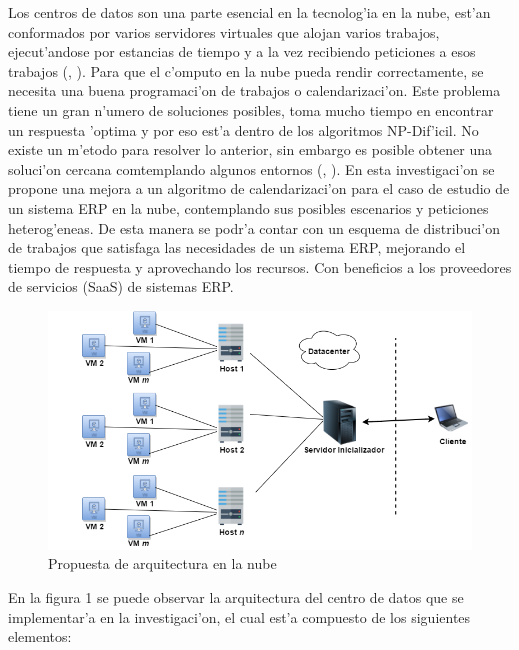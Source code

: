 Los centros de datos son una parte esencial en la tecnolog'ia en la nube, est'an conformados por varios servidores virtuales que alojan varios trabajos, ejecut'andose por estancias de tiempo y a la vez recibiendo peticiones a esos trabajos (\citeauthor{shimpy2014different}, \citeyear{shimpy2014different}).
Para que el c'omputo en la nube pueda rendir correctamente, se necesita una buena programaci'on de trabajos o calendarizaci'on. Este problema tiene un gran n'umero de soluciones posibles, toma mucho tiempo en encontrar un respuesta 'optima y por eso est'a dentro de los algoritmos NP-Dif'icil. No existe un m'etodo para resolver lo anterior, sin embargo es posible obtener una soluci'on cercana comtemplando algunos entornos (\citeauthor{shimpy2014different}, \citeyear{shimpy2014different}).
En esta investigaci'on se propone una mejora a un algoritmo de calendarizaci'on para el caso de estudio de un sistema ERP en la nube, contemplando sus posibles escenarios y peticiones heterog'eneas. De esta manera se podr'a contar con un esquema de distribuci'on de trabajos que satisfaga las necesidades de un sistema ERP, mejorando el tiempo de respuesta y aprovechando los recursos. Con beneficios a los proveedores de servicios (SaaS) de sistemas ERP.

\begin{figure}
	
	\centering
	\includegraphics[scale=0.5]{media/cloud2}
	\caption{Propuesta de arquitectura en la nube}
\end{figure}


En la figura 1 se puede observar la arquitectura del centro de datos que se implementar'a en la investigaci'on, el cual est'a compuesto de los siguientes elementos:

